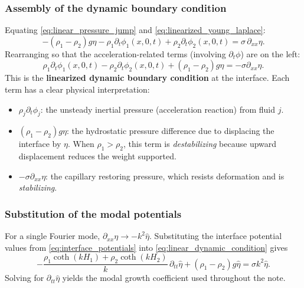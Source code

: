 \documentclass[11pt,a4paper]{article}
\begin{document}
\subsubsection{Assembly of the dynamic boundary condition}

Equating \eqref{eq:linear_pressure_jump} and \eqref{eq:linearized_young_laplace}:
\begin{equation}
    -(\rho_1-\rho_2)g\eta
    -\rho_1\partial_t\phi_1(x,0,t)
    +\rho_2\partial_t\phi_2(x,0,t)
    =
    \sigma\,\partial_{xx}\eta.
\end{equation}
Rearranging so that the acceleration-related terms (involving $\partial_t\phi$) are on the left:
\begin{equation}
    \boxed{
    \rho_1\partial_t\phi_1(x,0,t)
    -\rho_2\partial_t\phi_2(x,0,t)
    +(\rho_1-\rho_2)g\eta
    =
    -\sigma\partial_{xx}\eta.
    }
    \label{eq:linear_dynamic_condition}
\end{equation}
This is the \textbf{linearized dynamic boundary condition} at the interface.  Each term has a clear physical interpretation:
\begin{itemize}[leftmargin=*]
    \item $\rho_j\partial_t\phi_j$: the unsteady inertial pressure (acceleration reaction) from fluid $j$.
    \item $(\rho_1-\rho_2)g\eta$: the hydrostatic pressure difference due to displacing the interface by $\eta$.  When $\rho_1>\rho_2$, this term is \emph{destabilizing} because upward displacement reduces the weight supported.
    \item $-\sigma\partial_{xx}\eta$: the capillary restoring pressure, which resists deformation and is \emph{stabilizing}.
\end{itemize}

\subsubsection{Substitution of the modal potentials}

For a single Fourier mode, $\partial_{xx}\eta\to -k^2\widehat{\eta}$.  Substituting the interface potential values from \eqref{eq:interface_potentials} into \eqref{eq:linear_dynamic_condition} gives
\begin{equation}
    -\frac{\rho_1\coth(kH_1)+\rho_2\coth(kH_2)}{k}\,
    \partial_{tt}\widehat{\eta}
    +(\rho_1-\rho_2)g\widehat{\eta}
    =
    \sigma k^2\widehat{\eta}.
\end{equation}
Solving for $\partial_{tt}\widehat{\eta}$ yields the modal growth coefficient used throughout the note.
\end{document}
